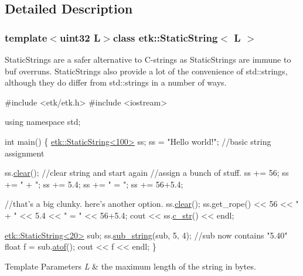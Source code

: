 \subsection{Detailed Description}
\subsubsection*{template$<$uint32 L$>$class etk\-::\-Static\-String$<$ L $>$}

Static\-Strings are a safer alternative to C-\/strings as Static\-Strings are immune to buf overruns. Static\-Strings also provide a lot of the convenience of std\-::strings, although they do differ from std\-::strings in a number of ways. 


\begin{DoxyCode}
\textcolor{preprocessor}{ #include <etk/etk.h>}
\textcolor{preprocessor}{#include <iostream>}

\textcolor{keyword}{using namespace }std;


\textcolor{keywordtype}{int} main()
\{
    \hyperlink{classetk_1_1_static_string}{etk::StaticString<100>} ss;
    ss = \textcolor{stringliteral}{"Hello world!"}; \textcolor{comment}{//basic string assignment}

    ss.\hyperlink{classetk_1_1_static_string_a5ddc4131a3eb881f56860cd563d1e537}{clear}(); \textcolor{comment}{//clear string and start again}
    \textcolor{comment}{//assign a bunch of stuff.}
    ss += 56;
    ss += \textcolor{stringliteral}{" + "};
    ss += 5.4;
    ss += \textcolor{stringliteral}{" = "};
    ss += 56+5.4;

    \textcolor{comment}{//that's a big clunky. here's another option.}
    ss.\hyperlink{classetk_1_1_static_string_a5ddc4131a3eb881f56860cd563d1e537}{clear}();
    ss.get\_rope() << 56 << \textcolor{stringliteral}{" + "} << 5.4  << \textcolor{stringliteral}{" = "} << 56+5.4;
    cout << ss.\hyperlink{classetk_1_1_static_string_aa775f517938685482baa772fb6cb1734}{c\_str}() << endl;

    \hyperlink{classetk_1_1_static_string}{etk::StaticString<20>} sub;
    ss.\hyperlink{classetk_1_1_static_string_af253b76226aefea02ab75f29ee674c5e}{sub\_string}(sub, 5, 4);
    \textcolor{comment}{//sub now contains "5.40"}
    \textcolor{keywordtype}{float} f = sub.\hyperlink{classetk_1_1_static_string_afd19d4edc8dd7c8439129268c4cf5eee}{atof}();
    cout << f << endl;
\}
\end{DoxyCode}
 
\begin{DoxyTemplParams}{Template Parameters}
{\em L} & the maximum length of the string in bytes. \\
\hline
\end{DoxyTemplParams}


